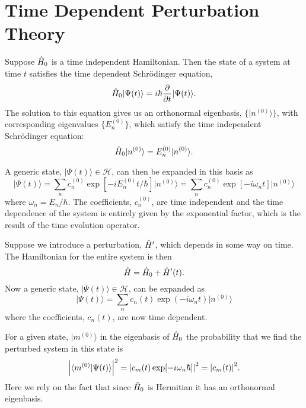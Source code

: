 \documentclass[a4paper]{article}
\renewcommand{\ket}[1]{\vert {#1} \rangle}
\renewcommand{\braket}[2]{\langle {#1} \vert {#2} \rangle}
\newcommand{\hilbert}{\mathcal{H}}
\begin{document}
    \section{Time Dependent Perturbation Theory}
    Suppose \(\hat{H}_0\) is a time independent Hamiltonian.
    Then the state of a system at time \(t\) satisfies the time dependent Schr\"odinger equation,
    \[\operator{H}_0\ket{\Psi(t)} = i\hbar\pdv{t}\ket{\Psi(t)}.\]
    The solution to this equation gives us an orthonormal eigenbasis, \(\{\ket{n^{(0)}}\}\), with corresponding eigenvalues \(\{E_n^{(0)}\}\), which satisfy the time independent Schr\"odinger equation:
    \[\operator{H}_0\ket{n^{(0)}} = E_n^{(0)}\ket{n^{(0)}}.\]
    
    A generic state, \(\ket{\Psi(t)}\in\hilbert\), can then be expanded in this basis as
    \[\ket{\Psi(t)} = \sum_n c_n^{(0)}\exp[-iE_n^{(0)}t/\hbar]\ket{n^{(0)}} = \sum_n c_n^{(0)}\exp[-i\omega_nt]\ket{n^{(0)}}\]
    where \(\omega_n = E_n/\hbar\).
    The coefficients, \(c_n^{(0)}\), are time independent and the time dependence of the system is entirely given by the exponential factor, which is the result of the time evolution operator.
    
    Suppose we introduce a perturbation, \(\hat{H}'\), which depends in some way on time.
    The Hamiltonian for the entire system is then
    \[\hat{H} = \hat{H}_0 + \hat{H}'(t).\]
    Now a generic state, \(\ket{\Psi(t)}\in\hilbert\), can be expanded as
    \[\ket{\Psi(t)} = \sum_{n} c_n(t) \exp(-i\omega_n t)\ket{n^{(0)}}\]
    where the coefficients, \(c_n(t)\), are now time dependent.
    
    For a given state, \(\ket{m^{(0)}}\) in the eigenbasis of \(\hat{H}_0\) the probability that we find the perturbed system in this state is
    \[\abs{\braket{m^{(0)}}{\Psi(t)}}^2 = \abs{c_m(t)\exp[-i\omega_n\hbar]}^2 = \abs{c_m(t)}^2.\]
    Here we rely on the fact that since \(\hat{H}_0\) is Hermitian it has an orthonormal eigenbasis.
    
\end{document}
